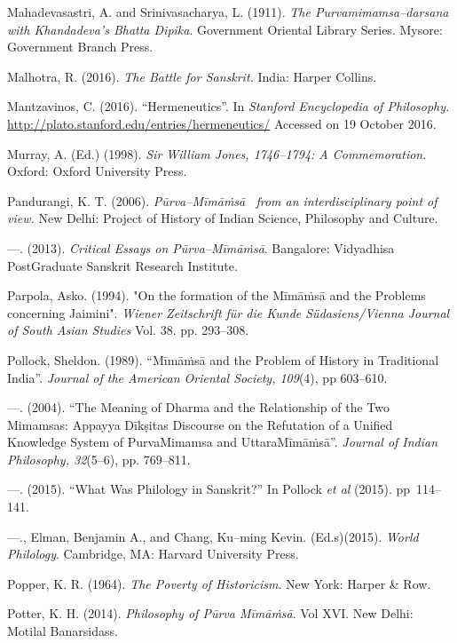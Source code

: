 \begin{thebibliography}{99}
  Mahadevasastri, A. and Srinivasacharya, L. (1911). \textit{The Purvamimamsa–darsana with Khandadeva's Bhatta Dipika}. Government Oriental Library Series. Mysore: Government Branch Press.

  Malhotra, R. (2016). \textit{The Battle for Sanskrit.} India: Harper Collins.

  Mantzavinos, C. (2016). “Hermeneutics”. In \textit{Stanford Encyclopedia of Philosophy.} \url{http://plato.stanford.edu/entries/hermeneutics/} Accessed on 19 October 2016.

  Murray, A. (Ed.) (1998). \textit{Sir William Jones, 1746–1794: A Commemoration}. Oxford: Oxford University Press.

  Pandurangi, K. T. (2006). \textit{Pūrva–Mīmāṁsā  from an interdisciplinary point of view.} New Delhi: Project of History of Indian Science, Philosophy and Culture.

  —. (2013). \textit{Critical Essays on Pūrva–Mīmāṁsā}. Bangalore: Vidyadhisa PostGraduate Sanskrit Research Institute.

  Parpola, Asko. (1994). "On the formation of the Mīmāṁsā and the Problems concerning Jaimini". \textit{Wiener Zeitschrift für die Kunde Südasiens/Vienna Journal of South Asian Studies} Vol. 38. pp. 293–308.

  Pollock, Sheldon. (1989). “Mīmāṁsā and the Problem of History in Traditional India”. \textit{Journal of the American Oriental Society, 109}(4), pp 603–610.

  —. (2004). “The Meaning of Dharma and the Relationship of the Two Mimamsas: Appayya Dīkṣitas Discourse on the Refutation of a Unified Knowledge System of PurvaMimamsa and UttaraMīmāṁsā”. \textit{Journal of Indian Philosophy, 32}(5–6), pp. 769–811.

  —. (2015). “What Was Philology in Sanskrit?” In Pollock \textit{et al} (2015). pp~114–141.

  —., Elman, Benjamin A., and Chang, Ku–ming Kevin. (Ed.s)(2015). \textit{World Philology}. Cambridge, MA: Harvard University Press.

  Popper, K. R. (1964). \textit{The Poverty of Historicism}. New York: Harper \& Row.

  Potter, K. H. (2014). \textit{Philosophy of Pūrva Mīmāṁsā}. Vol XVI. New Delhi: Motilal Banarsidass.


\end{thebibliography}
